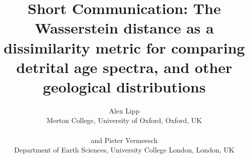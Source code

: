 \documentclass[gchron, manuscript]{article}
\begin{document}
\title{Short Communication: The Wasserstein distance as a dissimilarity metric for comparing detrital age spectra, and other geological distributions}



\author{Alex Lipp\\
  Merton College, University of Oxford, Oxford, UK \\~\\
  and Pieter Vermeesch\\
  Department of Earth Sciences, University College London, London, UK
}






\maketitle
\end{document}
